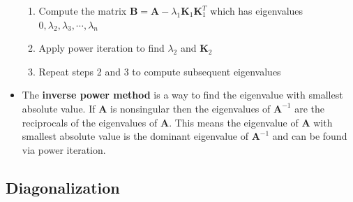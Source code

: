 \documentclass{article}
\begin{document}
\begin{itemize}
\begin{enumerate}
          \item Compute the matrix $\mathbf{B} = \mathbf{A} - \lambda_1 \mathbf{K}_1 \mathbf{K}_1^T$ which has eigenvalues \\ $0, \lambda_2, \lambda_3, \cdots, \lambda_n$

          \item Apply power iteration to find $\lambda_2$ and $\mathbf{K}_2$

          \item Repeat steps 2 and 3 to compute subsequent eigenvalues
        \end{enumerate}

  \item The \textbf{inverse power method} is a way to find the eigenvalue with smallest absolute value. If $\mathbf{A}$ is nonsingular then the eigenvalues of $\mathbf{A}^{-1}$ are the reciprocals of the eigenvalues of $\mathbf{A}$. This means the eigenvalue of $\mathbf{A}$ with smallest absolute value is the dominant eigenvalue of $\mathbf{A}^{-1}$ and can be found via power iteration.
\end{itemize}

\subsection{Diagonalization}
\end{document}
